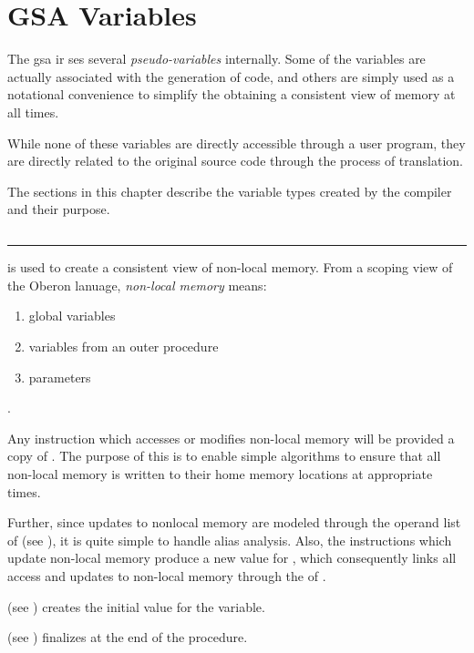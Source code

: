 \newenvironment{variable}[1]{\clearpage\section{\gsavar{#1}\label{var:#1}}\vspace{-\baselineskip}\rule{\textwidth}{.5pt}}{\clearpage}

\chapter{GSA Variables}

The \ac{gsa} \ac{ir} ses several \emph{pseudo-variables} internally.
Some of the variables are actually associated with the generation of
code, and others are simply used as a notational convenience to
simplify the obtaining a consistent view of memory at all times.

While none of these variables are directly accessible through a user
program, they are directly related to the original source code through
the process of translation.

The sections in this chapter describe the variable types created by
the compiler and their purpose.

\begin{variable}{nlm}
   is used to create a consistent view of non-local
  memory.  From a scoping view of the Oberon lanuage, \emph{non-local
    memory} means:
  \begin{enumerate}
  \item global variables
  \item variables from an outer procedure
  \item \byref parameters
  \end{enumerate}.

  Any instruction which accesses or modifies non-local memory will be
  provided a copy of .  The purpose of this is to enable
  simple algorithms to ensure that all non-local memory is written to
  their home memory locations at appropriate times.

  Further, since updates to nonlocal memory are modeled through the
  operand list of  (see ), it
  is quite simple to handle alias analysis.  Also, the instructions
  which update non-local memory produce a new value for
  , which consequently links all access and updates to
  non-local memory through the \duc of .

   (see )
  creates the initial value for the variable.

   (see )
  finalizes  at the end of the procedure.
\end{variable}

